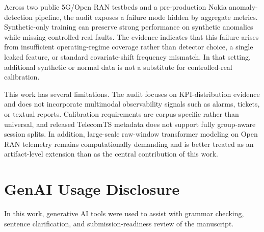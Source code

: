 \documentclass[sigconf,review]{acmart}
\begin{document}
Across two public 5G/Open RAN testbeds and a pre-production Nokia anomaly-detection pipeline, the audit exposes a failure mode hidden by aggregate metrics. Synthetic-only training can preserve strong performance on synthetic anomalies while missing controlled-real faults. The evidence indicates that this failure arises from insufficient operating-regime coverage rather than detector choice, a single leaked feature, or standard covariate-shift frequency mismatch. In that setting, additional synthetic or normal data is not a substitute for controlled-real calibration.

This work has several limitations. The audit focuses on KPI-distribution evidence and does not incorporate multimodal observability signals such as alarms, tickets, or textual reports. Calibration requirements are corpus-specific rather than universal, and released TelecomTS metadata does not support fully group-aware session splits. In addition, large-scale raw-window transformer modeling on Open RAN telemetry remains computationally demanding and is better treated as an artifact-level extension than as the central contribution of this work.

\section*{GenAI Usage Disclosure}
In this work, generative AI tools were used to assist with grammar checking, sentence clarification, and submission-readiness review of the manuscript.




\end{document}
